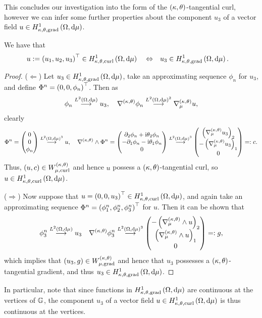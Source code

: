 This concludes our investigation into the form of the $\kt$-tangential curl, however we can infer some further properties about the component $u_3$ of a vector field $u\in\ktgradSob{\ddom}{\ddmes}$.
\begin{prop} \label{prop:CurlImpliesThirdCompGradient}
	We have that
	\begin{align*}
		u:=\bracs{u_1,u_2,u_3}^\top\in\ktcurlSob{\ddom}{\ddmes}
		\quad\Leftrightarrow\quad &
		u_3\in\ktgradSob{\ddom}{\ddmes}.
	\end{align*}
\end{prop}
\begin{proof}
	($\Leftarrow$) Let $u_3\in\ktgradSob{\ddom}{\ddmes}$, take an approximating sequence $\phi_n$ for $u_3$, and define $\Phi^n=\bracs{0,0,\phi_n}^\top$.
	Then as
	\begin{align*}
		\phi_n \lconv{\ltwo{\ddom}{\ddmes}} u_3, \quad \ktgrad\phi_n \lconv{\ltwo{\ddom}{\ddmes}^2} \ktgrad_{\ddmes}u,
	\end{align*}
	clearly
	\begin{align*}
		\Phi^n = \begin{pmatrix} 0 \\ 0 \\ \phi_n \end{pmatrix} \lconv{\ltwo{\ddom}{\ddmes}^3} u, \quad
		\ktcurl{}\Phi^n = \begin{pmatrix} \partial_2\phi_n + \rmi\qm_2\phi_n \\ -\partial_1\phi_n - \rmi\qm_1\phi_n \\ 0 \end{pmatrix} 
		\lconv{\ltwo{\ddom}{\ddmes}^3} \begin{pmatrix} \bracs{\ktgrad_{\ddmes}u_3}_2 \\ -\bracs{\ktgrad_{\ddmes}u_3}_1 \\ 0	\end{pmatrix} =: c.
	\end{align*}
	Thus, $\bracs{u, c}\in W^{\kt}_{\ddmes,\mathrm{curl}}$ and hence $u$ possess a $\kt$-tangential curl, so $u\in\ktcurlSob{\ddom}{\ddmes}$.
	
	($\Rightarrow$) Now suppose that $u=\bracs{0,0,u_3}^\top\in\ktcurlSob{\ddom}{\ddmes}$, and again take an approximating sequence $\Phi^n = \bracs{\phi^n_1, \phi^n_2, \phi^n_3}^\top$ for $u$.
	Then it can be shown that
	\begin{align*}
		\phi^n_3 \lconv{\ltwo{\ddom}{\ddmes}} u_3
		\quad \ktgrad\phi^n_3 \lconv{\ltwo{\ddom}{\ddmes}^3} \begin{pmatrix} -\bracs{ \ktcurl{\ddmes}u}_2 \\ \bracs{ \ktcurl{\ddmes}u}_1 \\ 0 \end{pmatrix} =: g,
	\end{align*}
	which implies that $\bracs{u_3,g}\in W^{\kt}_{\ddmes,\mathrm{grad}}$ and hence that $u_3$ possesses a $\kt$-tangential gradient, and thus $u_3\in\ktgradSob{\ddom}{\ddmes}$.
\end{proof}
In particular, note that since functions in $\ktgradSob{\ddom}{\ddmes}$ are continuous at the vertices of $\graph$, the component $u_3$ of a vector field $u\in\ktcurlSob{\ddom}{\ddmes}$ is thus continuous at the vertices.

